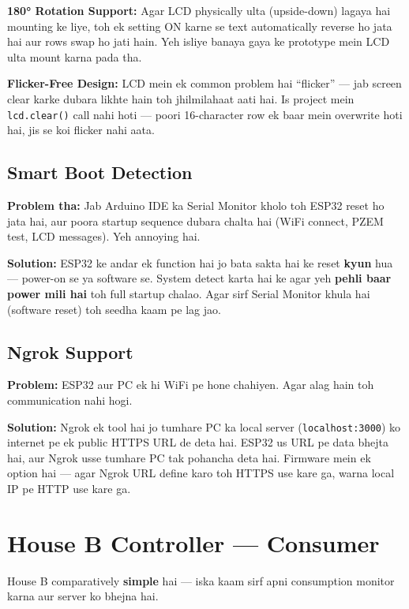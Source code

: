 \textbf{180° Rotation Support:} Agar LCD physically ulta (upside-down) lagaya hai mounting ke liye, toh ek setting ON karne se text automatically reverse ho jata hai aur rows swap ho jati hain. Yeh isliye banaya gaya ke prototype mein LCD ulta mount karna pada tha.

\textbf{Flicker-Free Design:} LCD mein ek common problem hai ``flicker'' --- jab screen clear karke dubara likhte hain toh jhilmilahaat aati hai. Is project mein \texttt{lcd.clear()} call nahi hoti --- poori 16-character row ek baar mein overwrite hoti hai, jis se koi flicker nahi aata.

\subsection{Smart Boot Detection}

\textbf{Problem tha:} Jab Arduino IDE ka Serial Monitor kholo toh ESP32 reset ho jata hai, aur poora startup sequence dubara chalta hai (WiFi connect, PZEM test, LCD messages). Yeh annoying hai.

\textbf{Solution:} ESP32 ke andar ek function hai jo bata sakta hai ke reset \textbf{kyun} hua --- power-on se ya software se. System detect karta hai ke agar yeh \textbf{pehli baar power mili hai} toh full startup chalao. Agar sirf Serial Monitor khula hai (software reset) toh seedha kaam pe lag jao.

\subsection{Ngrok Support}

\textbf{Problem:} ESP32 aur PC ek hi WiFi pe hone chahiyen. Agar alag hain toh communication nahi hogi.

\textbf{Solution:} Ngrok ek tool hai jo tumhare PC ka local server (\texttt{localhost:3000}) ko internet pe ek public HTTPS URL de deta hai. ESP32 us URL pe data bhejta hai, aur Ngrok usse tumhare PC tak pohancha deta hai. Firmware mein ek option hai --- agar Ngrok URL define karo toh HTTPS use kare ga, warna local IP pe HTTP use kare ga.

\section{House B Controller --- Consumer}

House B comparatively \textbf{simple} hai --- iska kaam sirf apni consumption monitor karna aur server ko bhejna hai.

